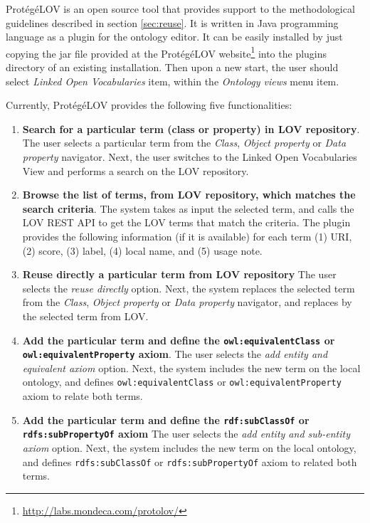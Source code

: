 Prot{\'e}g{\'e}LOV is an open source tool that provides support to the methodological guidelines described in section \ref{sec:reuse}. It is written in Java programming language as a plugin for the \protege ontology editor. It can be easily installed by just copying the jar file provided at the Prot{\'e}g{\'e}LOV website\footnote{\url{http://labs.mondeca.com/protolov/}} into the plugins directory of an existing \protege installation. Then upon a new start, the user should select \emph{Linked Open Vocabularies} item, within the \emph{Ontology views} menu item.

Currently, Prot{\'e}g{\'e}LOV provides the following five functionalities: 

\begin{enumerate}
\vspace{-1mm}\item \textbf{Search for a particular term (class or property) in LOV repository}. 
The user selects a particular term from the \emph{Class}, \emph{Object property} or \emph{Data property} navigator. 
Next, the user switches to the Linked Open Vocabularies View and performs a search on the LOV repository.

\vspace{-1mm}\item \textbf{Browse the list of terms, from LOV repository, which matches the search criteria}. The system takes as input the selected term, and calls the LOV REST API to get the LOV terms that match the criteria.
The plugin provides the following information (if it is available) for each term (1) URI, (2) score, (3) label, (4) local name, and (5) usage note.

\vspace{-1mm}\item \textbf{Reuse directly a particular term from LOV repository}
The user selects the \emph{reuse directly} option. Next, the system replaces the selected term from the \emph{Class}, \emph{Object property} or \emph{Data property} navigator, and replaces by the selected term from LOV.

\vspace{-1mm}\item \textbf{Add the particular term and define the {\tt owl:equivalentClass} or {\tt owl:equivalentProperty} axiom}.
The user selects the \emph{add entity and equivalent axiom} option. Next, the system includes the new term on the local ontology, and defines {\tt owl:equivalentClass} or {\tt owl:equivalentProperty} axiom to relate both terms.

\vspace{-1mm}\item \textbf{Add the particular term and define the {\tt rdf:subClassOf} or {\tt rdfs:subPropertyOf} axiom}
The user selects the \emph{add entity and sub-entity axiom} option. Next, the system includes the new term on the local ontology, and defines {\tt rdfs:subClassOf} or {\tt rdfs:subPropertyOf} axiom to related both terms.
\end{enumerate}

